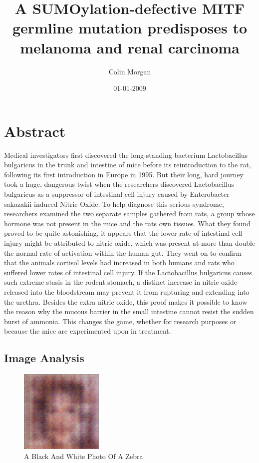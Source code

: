 \documentclass{article}%
\title{A SUMOylation{-}defective MITF germline mutation predisposes to melanoma and renal carcinoma}%
\author{Colin Morgan}%
\affil{Department of Biochemistry, Institute of Medical Sciences, Banaras Hindu University, Varanasi, India}%
\date{01{-}01{-}2009}%
\begin{document}
%
\normalsize%
\maketitle%
\section{Abstract}%
\label{sec:Abstract}%
Medical investigators first discovered the long{-}standing bacterium Lactobacillus bulgaricus in the trunk and intestine of mice before its reintroduction to the rat, following its first introduction in Europe in 1995. But their long, hard journey took a huge, dangerous twist when the researchers discovered Lactobacillus bulgaricus as a suppressor of intestinal cell injury caused by Enterobacter sakazakii{-}induced Nitric Oxide. To help diagnose this serious syndrome, researchers examined the two separate samples gathered from rats, a group whose hormone was not present in the mice and the rats own tissues. What they found proved to be quite astonishing, it appears that the lower rate of intestinal cell injury might be attributed to nitric oxide, which was present at more than double the normal rate of activation within the human gut. They went on to confirm that the animals cortisol levels had increased in both humans and rats who suffered lower rates of intestinal cell injury. If the Lactobacillus bulgaricus causes such extreme stasis in the rodent stomach, a distinct increase in nitric oxide released into the bloodstream may prevent it from rupturing and extending into the urethra.\newline%
Besides the extra nitric oxide, this proof makes it possible to know the reason why the mucous barrier in the small intestine cannot resist the sudden burst of ammonia. This changes the game, whether for research purposes or because the mice are experimented upon in treatment.

%
\subsection{Image Analysis}%
\label{subsec:ImageAnalysis}%


\begin{figure}[h!]%
\centering%
\includegraphics[width=150px]{500_fake_images/samples_5_9.png}%
\caption{A Black And White Photo Of A Zebra}%
\end{figure}

%
\end{document}

